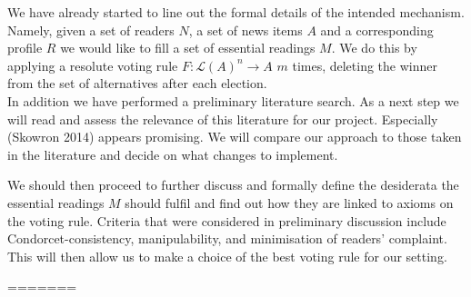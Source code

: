 \documentclass[10pt,a4paper, english]{article}
\begin{document}
We have already started to line out the formal details of the intended mechanism. Namely, given a set of readers $N$, a set of news items $A$ and a corresponding profile $R$ we would like to fill a set of essential readings $M$. We do this by applying a resolute voting rule $F:\mathcal{L}(A)^n \rightarrow A$ $m$ times, deleting the winner from the set of alternatives after each election.\\

In addition we have performed a preliminary literature search. As a next step we will read and assess the relevance of this literature for our project. Especially (Skowron 2014) appears promising. We will compare our approach to those taken in the literature and decide on what changes to implement.

We should then proceed to further discuss and formally define the desiderata the essential readings $M$ should fulfil and find out how they are linked to axioms on the voting rule. Criteria that were considered in preliminary discussion include Condorcet-consistency, manipulability, and minimisation of readers' complaint. This will then allow us to make a choice of the best voting rule for our setting.

=======
\end{document}

